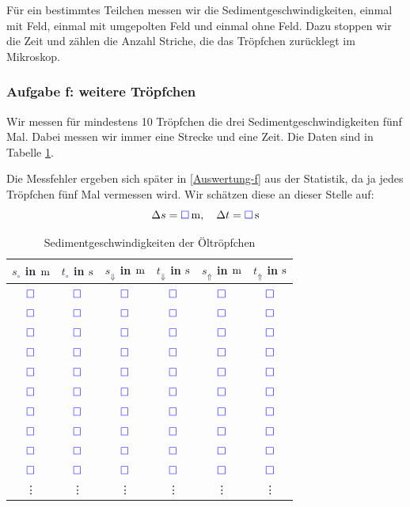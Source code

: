 \documentclass[11pt]{article}
\newcommand{\messwert}{\textcolor{blue}{\square}}
\begin{document}
Für ein bestimmtes Teilchen messen wir die Sedimentgeschwindigkeiten, einmal
mit Feld, einmal mit umgepolten Feld und einmal ohne Feld. Dazu stoppen wir die
Zeit und zählen die Anzahl Striche, die das Tröpfchen zurücklegt im Mikroskop.

\subsubsection{Aufgabe f: weitere Tröpfchen}

Wir messen für mindestens 10 Tröpfchen die drei Sedimentgeschwindigkeiten fünf
Mal. Dabei messen wir immer eine Strecke und eine Zeit. Die Daten sind in
Tabelle \ref{table:sediment1}.

Die Messfehler ergeben sich später in \ref{Auswertung-f} aus der Statistik, da
ja jedes Tröpfchen fünf Mal vermessen wird. Wir schätzen diese an dieser Stelle
auf:
\[
	\Delta s = \unit[\messwert] m
	, \quad
	\Delta t = \unit[\messwert] s
\]

\begin{table}[h!]
	\centering

	\begin{tabular}{cccccc}
		$s_\circ$ in $\unit m$ & $t_\circ$ in $\unit s$ & $s_\Downarrow$ in $\unit m$ & $t_\Downarrow$ in $\unit s$ & $s_\Uparrow$ in $\unit m$ & $t_\Uparrow$ in $\unit s$ \\
		\hline \hline
		$\messwert$ & $\messwert$ & $\messwert$ & $\messwert$ & $\messwert$ & $\messwert$\\
		$\messwert$ & $\messwert$ & $\messwert$ & $\messwert$ & $\messwert$ & $\messwert$\\
		$\messwert$ & $\messwert$ & $\messwert$ & $\messwert$ & $\messwert$ & $\messwert$\\
		$\messwert$ & $\messwert$ & $\messwert$ & $\messwert$ & $\messwert$ & $\messwert$\\
		$\messwert$ & $\messwert$ & $\messwert$ & $\messwert$ & $\messwert$ & $\messwert$\\
		\hline
		$\messwert$ & $\messwert$ & $\messwert$ & $\messwert$ & $\messwert$ & $\messwert$\\
		$\messwert$ & $\messwert$ & $\messwert$ & $\messwert$ & $\messwert$ & $\messwert$\\
		$\messwert$ & $\messwert$ & $\messwert$ & $\messwert$ & $\messwert$ & $\messwert$\\
		$\messwert$ & $\messwert$ & $\messwert$ & $\messwert$ & $\messwert$ & $\messwert$\\
		$\messwert$ & $\messwert$ & $\messwert$ & $\messwert$ & $\messwert$ & $\messwert$\\
		\hline
				\vdots & \vdots & \vdots & \vdots & \vdots & \vdots
	\end{tabular}

	\caption{Sedimentgeschwindigkeiten der Öltröpfchen}
	\label{table:sediment1}
\end{table}
\end{document}
